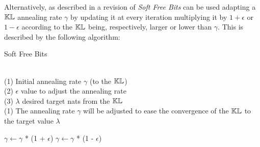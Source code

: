 Alternatively, as described in a revision of \cite{1611.02731} \emph{Soft Free Bits}
can be used adapting a $\mathbb{KL}$ annealing rate $\gamma$ by updating it
at every iteration multiplying it by $1+\epsilon$ or $1-\epsilon$
according to the $\mathbb{KL}$ being, respectively, larger or lower than $\gamma$.
This is described by the following algorithm:

\begin{algorithm}
\caption{Soft Free Bits}
\begin{algorithmic}[1]

\REQUIRE ~~\\
(1) Initial annealing rate $\gamma$ (to the $\mathbb{KL}$) \\
(2) $\epsilon$ value to adjust the annealing rate \\
(3) $\lambda$ desired target nats from the $\mathbb{KL}$
\ENSURE~~\\
(1) The annealing rate $\gamma$ will be adjusted to ease the convergence of the $\mathbb{KL}$
to the target value $\lambda$

\item[]
\IF{$\justkl > \lambda$}
    \STATE $\gamma \leftarrow \gamma$ * (1 + $\epsilon$)
\ELSE
    \STATE $\gamma \leftarrow \gamma$ * (1 - $\epsilon$)
\ENDIF
\end{algorithmic}
\end{algorithm}




